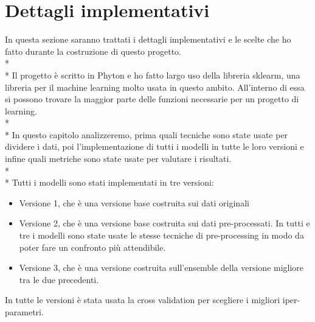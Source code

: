 \section{Dettagli implementativi}\label{sec:dettagli}
\normalsize
In questa sezione saranno trattati i dettagli implementativi e le scelte che ho fatto durante la costruzione di questo progetto.\\*\\*
Il progetto è scritto in Phyton e ho fatto largo uso della libreria sklearm, una libreria per il machine learning molto usata in questo ambito. All’interno di essa si possono trovare la maggior parte delle funzioni necessarie per un progetto di learning. \\*\\*
In questo capitolo analizzeremo, prima quali tecniche sono state usate per dividere i dati, poi l’implementazione di tutti i modelli in tutte le loro versioni e infine quali metriche sono state usate per valutare i risultati.\\*\\*
Tutti i modelli sono stati implementati in tre versioni:
\begin{itemize}
	\item Versione 1, che è una versione base costruita sui dati originali
	\item Versione 2, che è una versione base costruita sui dati pre-processati. In tutti e tre i modelli sono state usate le stesse tecniche di pre-processing in modo da poter fare un confronto più attendibile.
	\item Versione 3, che è una versione costruita sull’ensemble della versione migliore tra le due precedenti.
\end{itemize}
In tutte le versioni è stata usata la cross validation per scegliere i migliori iper-parametri.
